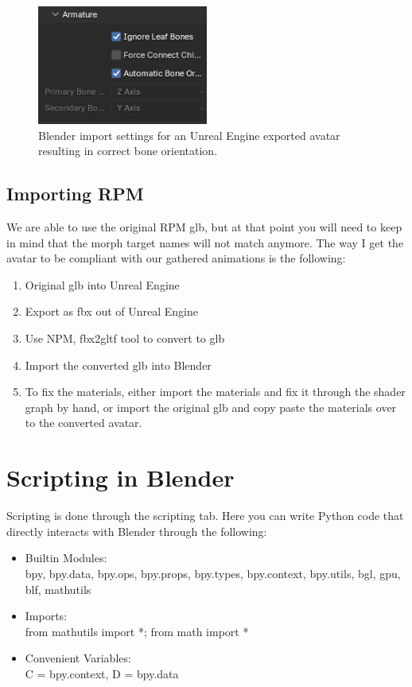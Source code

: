 \documentclass{uva-inf-article}
\begin{document}
\begin{figure}[hbt!]
    \centering
    \includegraphics[width=0.5\textwidth]{imgs/importsettings.png}
    \caption{Blender import settings for an Unreal Engine exported avatar resulting in correct bone orientation.}
    \label{fig:correctimportsettings}
\end{figure}

\subsection{Importing RPM}
We are able to use the original RPM glb, but at that point you will need to keep in mind that the morph target names will not match anymore. The way I get the avatar to be compliant with our gathered animations is the following:
\begin{enumerate}
    \item Original glb into Unreal Engine
    \item Export as fbx out of Unreal Engine
    \item Use NPM, fbx2gltf tool to convert to glb
    \item Import the converted glb into Blender
    \item To fix the materials, either import the materials and fix it through the shader graph by hand, or import the original glb and copy paste the materials over to the converted avatar.
\end{enumerate}


\section{Scripting in Blender}
Scripting is done through the scripting tab. Here you can write Python code that directly interacts with Blender through the following:
\begin{itemize}
    \item Builtin Modules:\\bpy, bpy.data, bpy.ops, bpy.props, bpy.types, bpy.context, bpy.utils, bgl, gpu, blf, mathutils
    \item Imports:\\from mathutils import *; from math import *
    \item Convenient Variables:\\C = bpy.context, D = bpy.data
\end{itemize}
\end{document}
